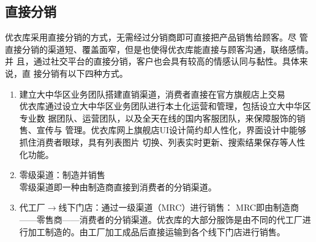 \documentclass{xjtureport}
\begin{document}
\subsection{直接分销}
优衣库采用直接分销的方式，无需经过分销商即可直接把产品销售给顾客。尽
管直接分销的渠道短、覆盖面窄，但是也使得优衣库能直接与顾客沟通，联络感情。并
且，通过社交平台的直接分销，客户也会具有较高的情感认同与黏性。具体来说，直
接分销有以下四种方式。
\begin{enumerate}
    \item 建立大中华区业务团队搭建直销渠道，消费者直接在官方旗舰店上交易\\
    优衣库通过设立大中华区业务团队进行本土化运营和管理，包括设立大中华区专业数
据团队、运营团队，以及全天在线的国内客服团队，来保障服饰的销售、宣传与
管理。优衣库网上旗舰店UI设计简约却人性化，界面设计中能够抓住消费者眼球，具有列表图片
切换、列表实时更新、搜索结果保存等人性化功能。
\item 零级渠道：制造并销售\\
零级渠道即一种由制造商直接到消费者的分销渠道。
\item 代工厂$\to$线下门店：通过一级渠道（MRC）进行销售：
    MRC即由制造商——零售商——消费者的分销渠道。优衣库的大部分服饰是由不同的代工厂进行加工制造的。由工厂加工成品后直接运输到各个线下门店进行销售。
\end{enumerate}
\end{document}
